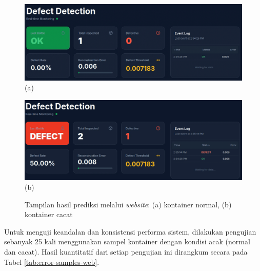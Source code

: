 \begin{figure}[H]
  \centering
  \begin{minipage}{\textwidth}
    \centering
    \includegraphics[width=\textwidth]{gambar/web_ss_normal.png}
    (a)
  \end{minipage}
  \vspace{1em}

  \begin{minipage}{\textwidth}
    \centering
    \includegraphics[width=\textwidth]{gambar/web_ss_cacat.png}
    (b)
  \end{minipage}
  \caption{Tampilan hasil prediksi melalui \textit{website}: (a)
  kontainer normal, (b) kontainer cacat}
  \label{fig:web-test}
  \vspace{-1em}
\end{figure}

Untuk menguji keandalan dan konsistensi performa sistem, dilakukan
pengujian sebanyak 25 kali menggunakan sampel kontainer dengan
kondisi acak (normal dan cacat). Hasil kuantitatif dari setiap
pengujian ini dirangkum secara pada Tabel \ref{tab:error-samples-web}.

